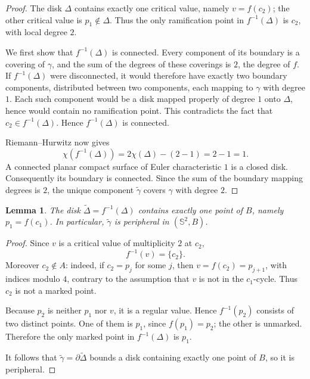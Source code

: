 \documentclass[11pt]{article}
\newcommand{\Sph}{\mathbb S^2}
\newtheorem{lemma}[theorem]{Lemma}
\theoremstyle{remark}
\begin{document}
\begin{proof}
The disk \(\Delta\) contains exactly one critical value, namely
\(v=f(c_2)\); the other critical value is \(p_1\notin\Delta\).
Thus the only ramification point in \(f^{-1}(\Delta)\) is \(c_2\),
with local degree \(2\).

We first show that \(f^{-1}(\Delta)\) is connected.  Every
component of its boundary is a covering of \(\gamma\), and the sum
of the degrees of these coverings is \(2\), the degree of \(f\).
If \(f^{-1}(\Delta)\) were disconnected, it would therefore have
exactly two boundary components, distributed between two components,
each mapping to \(\gamma\) with degree \(1\).  Each such component
would be a disk mapped properly of degree \(1\) onto \(\Delta\),
hence would contain no ramification point.  This contradicts the
fact that \(c_2\in f^{-1}(\Delta)\).  Hence \(f^{-1}(\Delta)\) is
connected.

Riemann--Hurwitz now gives
\[
\chi(f^{-1}(\Delta))
   =2\chi(\Delta)-(2-1)
   =2-1=1.
\]
A connected planar compact surface of Euler characteristic \(1\) is
a closed disk.  Consequently its boundary is connected.  Since the
sum of the boundary mapping degrees is \(2\), the unique component
\(\widetilde\gamma\) covers \(\gamma\) with degree \(2\).
\end{proof}

\begin{lemma}\label{lem:lift-peripheral}
The disk \(\widetilde\Delta=f^{-1}(\Delta)\) contains exactly one
point of \(B\), namely \(p_1=f(c_1)\).  In particular,
\(\widetilde\gamma\) is peripheral in \((\Sph,B)\).
\end{lemma}

\begin{proof}
Since \(v\) is a critical value of multiplicity \(2\) at \(c_2\),
\[
f^{-1}(v)=\{c_2\}.
\]
Moreover \(c_2\notin A\): indeed, if \(c_2=p_j\) for some \(j\), then
\(v=f(c_2)=p_{j+1}\), with indices modulo \(4\), contrary to the
assumption that \(v\) is not in the \(c_1\)-cycle.  Thus \(c_2\)
is not a marked point.

Because \(p_2\) is neither \(p_1\) nor \(v\), it is a regular value.
Hence \(f^{-1}(p_2)\) consists of two distinct points.  One of them
is \(p_1\), since \(f(p_1)=p_2\); the other is unmarked.  Therefore
the only marked point in \(f^{-1}(\Delta)\) is \(p_1\).

It follows that \(\widetilde\gamma=\partial\widetilde\Delta\)
bounds a disk containing exactly one point of \(B\), so it is
peripheral.
\end{proof}
\end{document}
